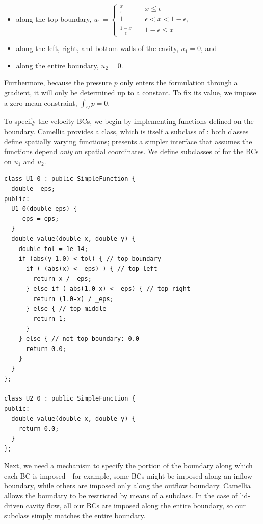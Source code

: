 \begin{itemize}
\item along the top boundary, $u_{1} = \left\{
\begin{array}{cl}
\frac{x}{\epsilon} 		& \quad x \leq \epsilon \\
1					& \quad \epsilon < x < 1 - \epsilon, \\
\frac{1 - x}{\epsilon}		& \quad 1 - \epsilon \leq x
\end{array}
\right.
$
\item along the left, right, and bottom walls of the cavity, $u_{1} = 0$, and
\item along the entire boundary, $u_{2} = 0$.
\end{itemize}
Furthermore, because the pressure $p$ only enters the formulation through a gradient, it will only be determined up to a constant.  To fix its value, we impose a zero-mean constraint, $\int_{\Omega} p = 0$.

To specify the velocity BCs, we begin by implementing functions defined on the boundary.  Camellia provides a  class, which is itself a subclass of : both classes define spatially varying functions;  presents a simpler interface that assumes the functions depend \emph{only} on spatial coordinates.  We define subclasses of  for the BCs on $u_{1}$ and $u_{2}$.

\begin{lstlisting}
class U1_0 : public SimpleFunction {
  double _eps;
public:
  U1_0(double eps) {
    _eps = eps;
  }
  double value(double x, double y) {
    double tol = 1e-14;
    if (abs(y-1.0) < tol) { // top boundary
      if ( (abs(x) < _eps) ) { // top left
        return x / _eps;
      } else if ( abs(1.0-x) < _eps) { // top right
        return (1.0-x) / _eps;
      } else { // top middle
        return 1;
      }
    } else { // not top boundary: 0.0
      return 0.0;
    }
  }
};

class U2_0 : public SimpleFunction {
public:
  double value(double x, double y) {
    return 0.0;
  }
};
\end{lstlisting}

Next, we need a mechanism to specify the portion of the boundary along which each BC is imposed---for example, some BCs might be imposed along an inflow boundary, while others are imposed only along the outflow boundary.  Camellia allows the boundary to be restricted by means of a  subclass.  In the case of lid-driven cavity flow, all our BCs are imposed along the entire boundary, so our  subclass simply matches the entire boundary.

